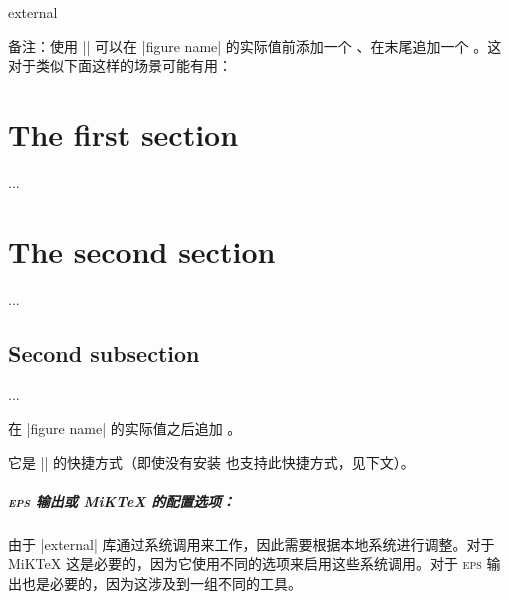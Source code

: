 {\begin{pgfplotslibrary}{external}
\begin{command}{}
            \medbreak
        备注：使用
        || 可以在 |figure name| 的实际值前添加一个 、在末尾追加一个 。这对于类似下面这样的场景可能有用：
\begin{codeexample}
\tikzset{external/figure name=main}


\chapter{The first section}
{
    ...
}

\chapter{The second section}
{
    ...
    \section{Second subsection}
    {
        ...
    }
}
\end{codeexample}
    \end{command}

    \begin{command}{\tikzappendtofigurename{}}
        在 |figure name| 的实际值之后追加 。

        它是
        || 的快捷方式（即使没有安装 \tikzname{} 也支持此快捷方式，见下文）。
    \end{command}


    \paragraph{\textsc{eps} 输出或 MiK\TeX{} 的配置选项：}

    由于 |external| 库通过系统调用来工作，因此需要根据本地系统进行调整。对于 MiK\TeX{} 这是必要的，因为它使用不同的选项来启用这些系统调用。对于 \textsc{eps} 输出也是必要的，因为这涉及到一组不同的工具。


\end{pgfplotslibrary}}
